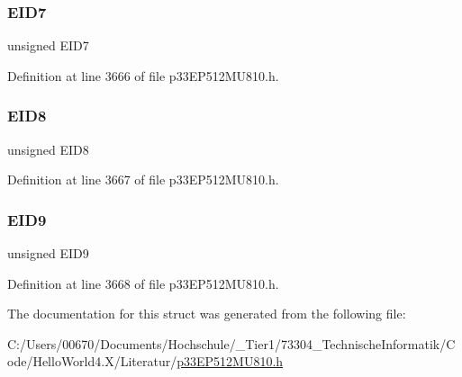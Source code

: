 \subsubsection{\texorpdfstring{E\+I\+D7}{EID7}}
{\footnotesize\ttfamily unsigned E\+I\+D7}



Definition at line 3666 of file p33\+E\+P512\+M\+U810.\+h.

\mbox{\label{structtag_c1_r_x_m2_e_i_d_b_i_t_s_acca25e0b7d86eb499d01f85222baea87}} 
\subsubsection{\texorpdfstring{E\+I\+D8}{EID8}}
{\footnotesize\ttfamily unsigned E\+I\+D8}



Definition at line 3667 of file p33\+E\+P512\+M\+U810.\+h.

\mbox{\label{structtag_c1_r_x_m2_e_i_d_b_i_t_s_ac6748f73d4ada8538b06548be4f396c2}} 
\subsubsection{\texorpdfstring{E\+I\+D9}{EID9}}
{\footnotesize\ttfamily unsigned E\+I\+D9}



Definition at line 3668 of file p33\+E\+P512\+M\+U810.\+h.



The documentation for this struct was generated from the following file\+:\begin{DoxyCompactItemize}
\item 
C\+:/\+Users/00670/\+Documents/\+Hochschule/\+\_\+\+Tier1/73304\+\_\+\+Technische\+Informatik/\+Code/\+Hello\+World4.\+X/\+Literatur/\hyperlink{p33_e_p512_m_u810_8h}{p33\+E\+P512\+M\+U810.\+h}\end{DoxyCompactItemize}
